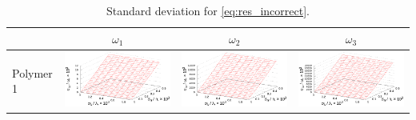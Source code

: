 \documentclass[11pt,a4paper]{article}
\theoremstyle{definition}
\begin{document}
\begin{table}[h]
  \centering
  \footnotesize
  \caption{Standard deviation for \eqref{eq:res_incorrect}.}
  \begin{tabular}{l | c c c}
	  & $\omega_1$ & $\omega_2$ & $\omega_3$ \\ \hline
	\begin{rotate}{90}Polymer 1\end{rotate} &	\includegraphics[scale=0.4]{figs/all/p1.txt_coeff0.dat.eps} & \includegraphics[scale=0.4]{figs/all/p1.txt_coeff1.dat.eps} & \includegraphics[scale=0.4]{figs/all/p1.txt_coeff2.dat.eps} \\

\end{tabular}
\end{table}
\end{document}
